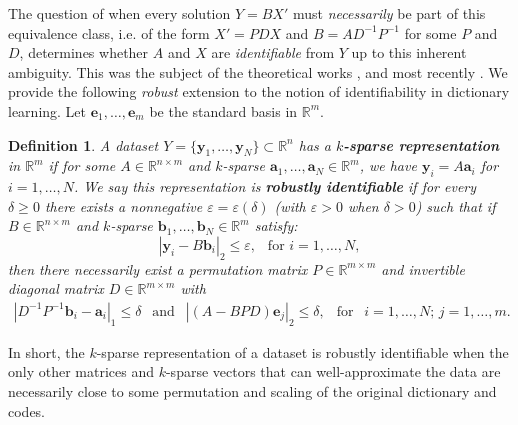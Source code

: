 \documentclass[journal, onecolumn]{IEEEtran}
\newtheorem{definition}{Definition}
\begin{document}
The question of when every solution $Y = BX'$ must \emph{necessarily} be part of this equivalence class, i.e. of the form $X' = PDX$ and $B = AD^{-1}P^{-1}$ for some $P$ and $D$, determines whether $A$ and $X$ are \emph{identifiable} from $Y$ up to this inherent ambiguity. This was the subject of the theoretical works \cite{Georgiev05, Aharon06}, and most recently \cite{Hillar15}. We provide the following \emph{robust} extension to the notion of identifiability in dictionary learning. Let $\mathbf{e}_1, \ldots, \mathbf{e}_m$ be the standard basis in $\mathbb{R}^m$. 

\begin{definition}\label{Uniqueness}
A dataset $Y = \{\mathbf{y}_1, \ldots, \mathbf{y}_N\} \subset \mathbb{R}^n$ has a \textbf{$k$-sparse representation} in $\mathbb{R}^m$ if for some $A \in \mathbb{R}^{n \times m}$ and $k$-sparse $\mathbf{a}_1, \ldots, \mathbf{a}_N \in \mathbb{R}^m$, we have $\mathbf{y}_i = A\mathbf{a}_i$ for $i = 1, \ldots, N$. We say this representation is \textbf{robustly identifiable} if for every $\delta \geq 0$ there exists a nonnegative $\varepsilon = \varepsilon(\delta)$ (with $\varepsilon > 0$ when $\delta > 0$) such that if $B \in \mathbb{R}^{n \times m}$ and $k$-sparse $\mathbf{b}_1, \ldots, \mathbf{b}_N \in \mathbb{R}^m$ satisfy:
\[|\mathbf{y}_i - B\mathbf{b}_i|_2 \leq \varepsilon, \ \ \text{ for } i = 1, \ldots, N,\]
%
then there necessarily exist a permutation matrix $P \in \mathbb{R}^{m \times m}$ and invertible diagonal matrix $D \in \mathbb{R}^{m \times m}$ with
\begin{align}\label{def1}
|D^{-1}P^{-1}\mathbf{b}_i - \mathbf{a}_i|_1 \leq \delta \ \ \text{ and } \ \ |(A - BPD)\mathbf{e}_j|_2 \leq \delta, \ \ \text{ for } \ \ i = 1, \ldots, N; \, j = 1, \ldots, m.
\end{align}
\end{definition}

In short, the $k$-sparse representation of a dataset is robustly identifiable when the only other matrices and $k$-sparse vectors that can well-approximate the data are necessarily close to some permutation and scaling of the original dictionary and codes.
\end{document}
